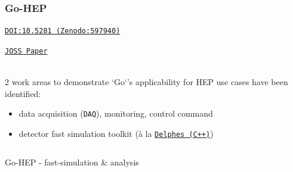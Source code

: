 \documentclass[9pt]{beamer}
\newcommand{\myblue} [1] {{\color{blue}#1}}
\begin{document}
\begin{frame}[fragile]
\frametitle{Go-HEP}


	\begin{block}{}
\myblue{\href{https://doi.org/10.5281/zenodo.597940}{\texttt{DOI:10.5281 (Zenodo:597940)}}}

\myblue{\href{http://joss.theoj.org/papers/0b007c81073186f7c61f95ea26ad7971}{\texttt{JOSS Paper}}}
	\end{block}{}
	\quad\\

2 work areas to demonstrate `Go`'s applicability for HEP use cases have been identified:


\begin{itemize}
\item data acquisition (\texttt{DAQ}), monitoring, control command
\item detector fast simulation toolkit (\`a la \myblue{\href{https://cp3.irmp.ucl.ac.be/projects/delphes}{\texttt{Delphes (C++)}}})
\end{itemize}


\end{frame}

\begin{frame}[fragile]
	\begin{columns}
		\begin{column}{0.70\textwidth}
			\begin{block}{}
				\begin{center}
Go-HEP - fast-simulation \& analysis
				\end{center}
			\end{block}
		\end{column}
	\end{columns}



\end{frame}
\end{document}
